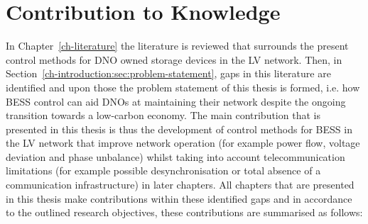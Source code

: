 \section{Contribution to Knowledge}
\label{ch-conclusions:sec:knowledge-contribution}

In Chapter~\ref{ch-literature} the literature is reviewed that surrounds the present control methods for DNO owned storage devices in the LV network.
Then, in Section~\ref{ch-introduction:sec:problem-statement}, gaps in this literature are identified and upon those the problem statement of this thesis is formed, i.e. how BESS control can aid DNOs at maintaining their network despite the ongoing transition towards a low-carbon economy.
The main contribution that is presented in this thesis is thus the development of control methods for BESS in the LV network that improve network operation (for example power flow, voltage deviation and phase unbalance) whilst taking into account telecommunication limitations (for example possible desynchronisation or total absence of a communication infrastructure) in later chapters.
All chapters that are presented in this thesis make contributions within these identified gaps and in accordance to the outlined research objectives, these contributions are summarised as follows:

